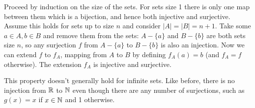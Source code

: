 \documentclass{article}
\begin{document}
Proceed by induction on the size of the sets. For sets size 1 there is only one map between them which is a bijection, and hence both injective and surjective. Assume this holds for sets up to size $n$ and consider $|A| = |B| = n+1$. Take some $a\in A, b\in B$ and remove them from the sets: $A - \{a\}$ and $B - \{b\}$ are both sets size $n$, so any surjection $f$ from $A - \{a\}$ to $B - \{b\}$ is also an injection. Now we can extend $f$ to $f_A$, mapping from $A$ to $B$ by defining $f_A(a) = b$ (and $f_A = f$ otherwise). The extension $f_A$ is injective and surjective.

This property doesn't generally hold for infinite sets. Like before, there is no injection from $\mathbb{R}$ to $\mathbb{N}$ even though there are any number of surjections, such as $g(x) = x$ if $x \in \mathbb{N}$ and 1 otherwise.
\end{document}
